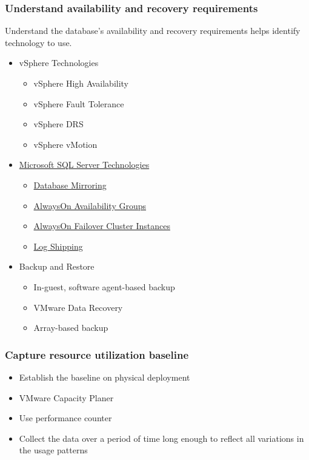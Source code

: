 \documentclass[CJK]{beamer}
\begin{document}
\begin{frame}[t]
    \frametitle{Understand availability and recovery requirements}
    Understand the database's availability and recovery requirements helps identify technology to use.
    \begin{itemize}
        \item vSphere Technologies
        \begin{itemize}
            \item vSphere High Availability
            \item vSphere Fault Tolerance
            \item vSphere DRS
            \item vSphere vMotion
        \end{itemize}
        \item \href{http://msdn.microsoft.com/en-us/library/ms190202(v=sql.110).aspx}{Microsoft SQL Server Technologies}
        \begin{itemize}
            \item \href{http://msdn.microsoft.com/en-us/library/ms189852(v=sql.110).aspx}{Database Mirroring}
            \item \href{http://msdn.microsoft.com/en-us/library/hh510230(v=sql.110).aspx}{AlwaysOn Availability Groups}
            \item \href{http://msdn.microsoft.com/en-us/library/ms189134(v=sql.110).aspx}{AlwaysOn Failover Cluster Instances}
            \item \href{http://msdn.microsoft.com/en-us/library/ms187103(v=sql.110).aspx}{Log Shipping}
        \end{itemize}
        \item Backup and Restore
            \begin{itemize}
                \item In-guest, software agent-based backup
                \item VMware Data Recovery
                \item Array-based backup
            \end{itemize}
    \end{itemize}
\end{frame}

\begin{frame}[t]
    \frametitle{Capture resource utilization baseline}
    \begin{itemize}
        \item Establish the baseline on physical deployment
        \item VMware Capacity Planer
        \item Use performance counter
        \item Collect the data over a period of time long enough to reflect all variations in the usage patterns
    \end{itemize}
\end{frame}
\end{document}

